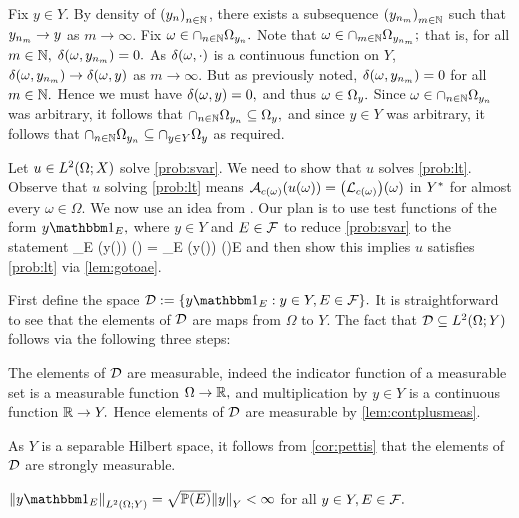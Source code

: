 Fix $y \in Y.$ By density of $\mleft(\yn\mright)_{n \in \NN}$, there exists a subsequence $\ynmseq$ such that $y_{n_{m}} \rightarrow y$ as $m \rightarrow \infty.$ Fix $\omega \in \cap_{n \in \mathbb N} \Omega_{y_{n}}.$ Note that $\omega \in \cap_{m \in \mathbb N} \Omega_{y_{n_{m}}};$ that is, for all $m \in \mathbb N,$ $\delta(\omega,y_{n_{m}}) =0.$ As $\delta(\omega,\cdot)$ is a continuous function on $Y$, $\delta(\omega,y_{n_{m}}) \rightarrow \delta(\omega,y)$ as $m \rightarrow \infty.$ But as previously noted, $\delta(\omega,y_{n_{m}})=0$ for all $m \in \mathbb N.$ Hence we must have $\delta(\omega,y)=0,$ and thus $\omega \in \Omega_{y}.$ Since $\omega \in \cap_{n \in \mathbb N} \Omega_{y_{n}}$ was arbitrary, it follows that $\cap_{n \in \mathbb N} \Omega_{y_{n}} \subseteq \Omega_{y},$ and since $y \in Y$ was arbitrary, it follows that $\cap_{n \in \mathbb N} \Omega_{y_{n}} \subseteq \cap_{y \in Y} \Omega_{y}$ as required.
\epf

\label{page:thm12proof}
Let $u \in \LtOX$ solve \cref{prob:svar}. We need to show that $u$ solves \cref{prob:lt}. Observe that $u$ solving \cref{prob:lt} means $\Acomega(u(\omega)) = \mleft(\Lcomega\mright)(\omega)$ in $Y^{*}$ for almost every $\omega \in \Omega.$ We now use an idea from \cite[Theorem 3.3]{Gi:10}. Our plan is to use test functions of the form $y\Ind{E},$ where $y \in Y$ and $E \in \mathcal F$ to reduce \cref{prob:svar} to the statement
\beqs
\int_E \big(y(\omega)\big) \dd\PP(\omega) = \int_E \mleft[\mleft(\Lcomega\mright)(\omega)\mright]\big(y(\omega)\big) \dd\PP(\omega)\quad \tforall E \in \cF
\eeqs
and then show this implies $u$ satisfies \cref{prob:lt} via \cref{lem:gotoae}.

First define the space
$\D := \set{y\Ind{E} \st y \in Y, E \in \cF}.$
It is straightforward to see that the elements of $\mathcal D$ are maps from $\Omega$ to $Y.$ The fact that $\D \subseteq \LtOY$ follows via the following three steps:

\ben
\item The elements of $\mathcal D$ are measurable, indeed the indicator function of a measurable set is a measurable function $\Omega\rightarrow\mathbb R,$ and multiplication by $y \in Y$ is a continuous function $\mathbb R\rightarrow Y.$ Hence elements of $\mathcal D$ are measurable by \cref{lem:contplusmeas}.
\item As $Y$ is a separable Hilbert space, it follows from \cref{cor:pettis} that the elements of $\mathcal D$ are strongly measurable.
\item $\NLtOY{y\Ind{E}} = \sqrt{\PP\mleft(E\mright)}\NY{y} < \infty$ for all $y \in Y, E \in \mathcal F.$
  \een

